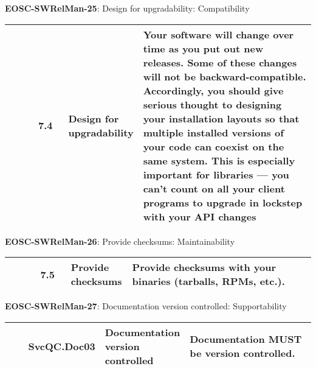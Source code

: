 \textbf{EOSC-SWRelMan-25}: Design for upgradability: Compatibility
\nopagebreak[4]
\begin{center}
    \tabletail{\hline}
    \tiny
    \begin{supertabular}{|p{0.10\linewidth}|p{0.10\linewidth}|p{0.20\linewidth}|p{0.60\linewidth}|} \hline
        \cite{raymond_software_2013} & 7.4 & Design for upgradability & Your software will change over time as you put out new releases. Some of these changes will not be backward-compatible. Accordingly, you should give serious thought to designing your installation layouts so that multiple installed versions of your code can coexist on the same system. This is especially important for libraries — you can't count on all your client programs to upgrade in lockstep with your API changes\\ \hline
    \end{supertabular}
\end{center}

\textbf{EOSC-SWRelMan-26}: Provide checksums: Maintainability
\nopagebreak[4]
\begin{center}
    \tabletail{\hline}
    \tiny
    \begin{supertabular}{|p{0.10\linewidth}|p{0.10\linewidth}|p{0.20\linewidth}|p{0.60\linewidth}|} \hline
        \cite{raymond_software_2013} & 7.5 & Provide checksums & Provide checksums with your binaries (tarballs, RPMs, etc.).\\ \hline
    \end{supertabular}
\end{center}

\textbf{EOSC-SWRelMan-27}: Documentation version controlled: Supportability
\nopagebreak[4]
\begin{center}
    \tabletail{\hline}
    \tiny
    \begin{supertabular}{|p{0.10\linewidth}|p{0.10\linewidth}|p{0.20\linewidth}|p{0.60\linewidth}|} \hline
        \cite{orviz_fernandez_eosc-synergy_2020} & SvcQC.Doc03 & Documentation version controlled & Documentation MUST be version controlled.\\ \hline
    \end{supertabular}
\end{center}

